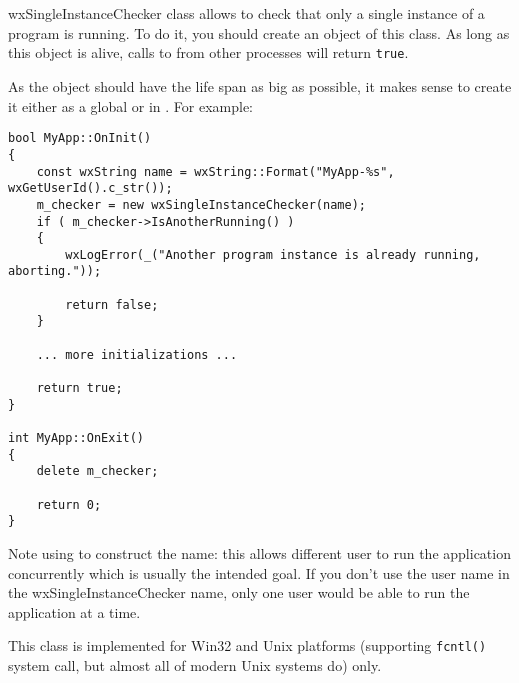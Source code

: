 
\section{}\label{wxsingleinstancechecker}

wxSingleInstanceChecker class allows to check that only a single instance of a
program is running. To do it, you should create an object of this class. As
long as this object is alive, calls to 
 from
other processes will return {\tt true}.

As the object should have the life span as big as possible, it makes sense to
create it either as a global or in . For
example:

\begin{verbatim}
bool MyApp::OnInit()
{
    const wxString name = wxString::Format("MyApp-%s", wxGetUserId().c_str());
    m_checker = new wxSingleInstanceChecker(name);
    if ( m_checker->IsAnotherRunning() )
    {
        wxLogError(_("Another program instance is already running, aborting."));

        return false;
    }

    ... more initializations ...

    return true;
}

int MyApp::OnExit()
{
    delete m_checker;

    return 0;
}
\end{verbatim}

Note using  to construct the name: this
allows different user to run the application concurrently which is usually the
intended goal. If you don't use the user name in the wxSingleInstanceChecker
name, only one user would be able to run the application at a time.

This class is implemented for Win32 and Unix platforms (supporting {\tt fcntl()}
system call, but almost all of modern Unix systems do) only.


